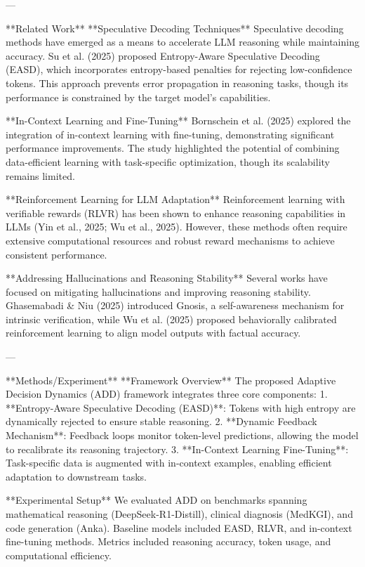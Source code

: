---

**Related Work**  
**Speculative Decoding Techniques**  
Speculative decoding methods have emerged as a means to accelerate LLM reasoning while maintaining accuracy. Su et al. (2025) proposed Entropy-Aware Speculative Decoding (EASD), which incorporates entropy-based penalties for rejecting low-confidence tokens. This approach prevents error propagation in reasoning tasks, though its performance is constrained by the target model's capabilities.  

**In-Context Learning and Fine-Tuning**  
Bornschein et al. (2025) explored the integration of in-context learning with fine-tuning, demonstrating significant performance improvements. The study highlighted the potential of combining data-efficient learning with task-specific optimization, though its scalability remains limited.  

**Reinforcement Learning for LLM Adaptation**  
Reinforcement learning with verifiable rewards (RLVR) has been shown to enhance reasoning capabilities in LLMs (Yin et al., 2025; Wu et al., 2025). However, these methods often require extensive computational resources and robust reward mechanisms to achieve consistent performance.  

**Addressing Hallucinations and Reasoning Stability**  
Several works have focused on mitigating hallucinations and improving reasoning stability. Ghasemabadi & Niu (2025) introduced Gnosis, a self-awareness mechanism for intrinsic verification, while Wu et al. (2025) proposed behaviorally calibrated reinforcement learning to align model outputs with factual accuracy.  

---

**Methods/Experiment**  
**Framework Overview**  
The proposed Adaptive Decision Dynamics (ADD) framework integrates three core components:  
1. **Entropy-Aware Speculative Decoding (EASD)**: Tokens with high entropy are dynamically rejected to ensure stable reasoning.  
2. **Dynamic Feedback Mechanism**: Feedback loops monitor token-level predictions, allowing the model to recalibrate its reasoning trajectory.  
3. **In-Context Learning Fine-Tuning**: Task-specific data is augmented with in-context examples, enabling efficient adaptation to downstream tasks.  

**Experimental Setup**  
We evaluated ADD on benchmarks spanning mathematical reasoning (DeepSeek-R1-Distill), clinical diagnosis (MedKGI), and code generation (Anka). Baseline models included EASD, RLVR, and in-context fine-tuning methods. Metrics included reasoning accuracy, token usage, and computational efficiency.  

